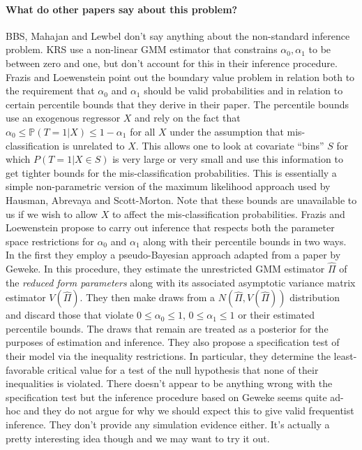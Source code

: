 \documentclass[12pt]{article}
\begin{document}
\paragraph{What do other papers say about this problem?}
BBS, Mahajan and Lewbel don't say anything about the non-standard inference problem.
KRS use a non-linear GMM estimator that constrains $\alpha_0, \alpha_1$ to be between zero and one, but don't account for this in their inference procedure.
Frazis and Loewenstein point out the boundary value problem in relation both to the requirement that $\alpha_0$ and $\alpha_1$ should be valid probabilities and in relation to certain percentile bounds that they derive in their paper.
The percentile bounds use an exogenous regressor $X$ and rely on the fact that $\alpha_0 \leq \mathbb{P}(T=1|X) \leq 1 - \alpha_1$ for all $X$ under the assumption that mis-classification is unrelated to $X$.
This allows one to look at covariate ``bins'' $S$ for which $P(T=1|X\in S)$ is very large or very small and use this information to get tighter bounds for the mis-classification probabilities.
This is essentially a simple non-parametric version of the maximum likelihood approach used by Hausman, Abrevaya and Scott-Morton.
Note that these bounds are unavailable to us if we wish to allow $X$ to affect the mis-classification probabilities.
Frazis and Loewenstein propose to carry out inference that respects both the parameter space restrictions for $\alpha_0$ and $\alpha_1$ along with their percentile bounds in two ways.
In the first they employ a pseudo-Bayesian approach adapted from a paper by Geweke.
In this procedure, they estimate the unrestricted GMM estimator $\widehat{\Pi}$ of the \emph{reduced form parameters} along with its associated asymptotic variance matrix estimator $V(\widehat{\Pi})$.
They then make draws from a $N(\widehat{\Pi}, V(\widehat{\Pi}))$ distribution and discard those that violate $0 \leq \alpha_0 \leq 1$, $0 \leq \alpha_1 \leq 1$ or their estimated percentile bounds.
The draws that remain are treated as a posterior for the purposes of estimation and inference.
They also propose a specification test of their model via the inequality restrictions.
In particular, they determine the least-favorable critical value for a test of the null hypothesis that none of their inequalities is violated.
There doesn't appear to be anything wrong with the specification test but the inference procedure based on Geweke seems quite ad-hoc and they do not argue for why we should expect this to give valid frequentist inference.
They don't provide any simulation evidence either.
It's actually a pretty interesting idea though and we may want to try it out.
\end{document}
